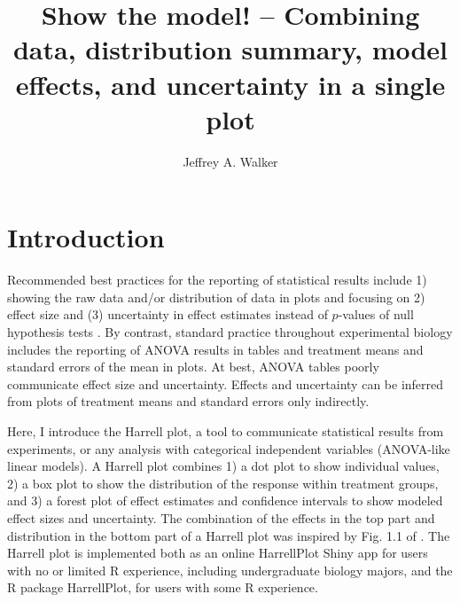 \documentclass[fleqn,10pt,lineno]{wlpeerj} %
\title{Show the model! -- Combining data, distribution summary, model effects, and uncertainty in a single plot}
\author[1]{Jeffrey A. Walker}
\affil[1]{Department of Biological Sciences, University of Southern Maine, 70 Falmouth St., Portland, ME 04103}
\begin{document}
\flushbottom
\maketitle
\thispagestyle{empty}

\section*{Introduction}
Recommended best practices for the reporting of statistical results include 1) showing the raw data and/or distribution of data in plots \citep{Drummond_Show_2011,Weissgerber_Bar_2015,Spitzer_BoxPlotR_2014,Krzywinski_Points_2014,Harrell_Statistical_2002,Weissgerber_Transparent_2016} and focusing on 2) effect size and (3) uncertainty in effect estimates instead of $p$-values of null hypothesis tests \citep{Nakagawa_Effect_2007, Yoccoz_Use_1991, Johnson_insignificance_1999, Curran-Everett_Fundamental_1998}. By contrast, standard practice throughout experimental biology includes the reporting of ANOVA results in tables and treatment means and standard errors of the mean in plots. At best, ANOVA tables poorly communicate effect size and uncertainty. Effects and uncertainty can be inferred from plots of treatment means and standard errors only indirectly.

Here, I introduce the Harrell plot, a tool to communicate statistical results from experiments, or any analysis with categorical independent variables (ANOVA-like linear models). A Harrell plot combines 1) a dot plot to show individual values, 2) a box plot to show the distribution of the response within treatment groups, and 3) a forest plot of effect estimates and confidence intervals to show modeled effect sizes and uncertainty. The combination of the effects in the top part and distribution in the bottom part of a Harrell plot was inspired by Fig. 1.1 of \cite{Harrell_Statistical_2002}. The Harrell plot is implemented both as an online HarrellPlot Shiny app for users with no or limited R experience, including undergraduate biology majors, and the R package HarrellPlot, for users with some R experience. 
\end{document}
